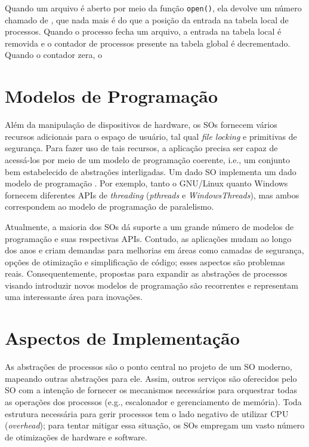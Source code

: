 Quando um arquivo é aberto por meio da função \texttt{open()}, ela devolve um
número chamado de ,
que nada mais é do que a posição da entrada na tabela local de processos.
Quando o processo fecha um arquivo, a entrada na tabela local é removida e o
contador de processos presente na tabela global é decrementado. Quando o
contador zera, o 

\section{Modelos de Programação}

Além da manipulação de dispositivos de hardware, os SOs fornecem vários
recursos adicionais para o espaço de usuário, tal qual \emph{file locking} e
primitivas de segurança. Para fazer uso de tais recursos, a aplicação precisa
ser capaz de acessá-los por meio de um modelo de programação coerente, i.e., um
conjunto bem estabelecido de abstrações interligadas. Um dado SO implementa um
dado modelo de programação . Por exemplo, tanto o
GNU/Linux quanto Windows fornecem diferentes APIs de \emph{threading}
(\emph{pthreads} e \emph{WindowsThreads}), mas ambos correspondem ao modelo de
programação de paralelismo.

Atualmente, a maioria dos SOs dá suporte a um grande número de modelos de
programação e suas respectivas APIs. Contudo, as aplicações mudam ao longo dos
anos e criam demandas para melhorias em áreas como camadas de segurança, opções
de otimização e simplificação de código; esses aspectos são problemas reais.
Consequentemente, propostas para expandir as abstrações de processos visando
introduzir novos modelos de programação são recorrentes e representam uma
interessante área para inovações.

\section{Aspectos de Implementação}

As abstrações de processos são o ponto central no projeto de um SO moderno,
mapeando outras abstrações para ele. Assim, outros serviços são oferecidos pelo
SO com a intenção de fornecer os mecanismos necessários para orquestrar todas
as operações dos processos (e.g., escalonador e gerenciamento de memória). Toda
estrutura necessária para gerir processos tem o lado negativo de utilizar CPU
(\emph{overhead}); para tentar mitigar essa situação, os SOs empregam um vasto
número de otimizações de hardware e software.

